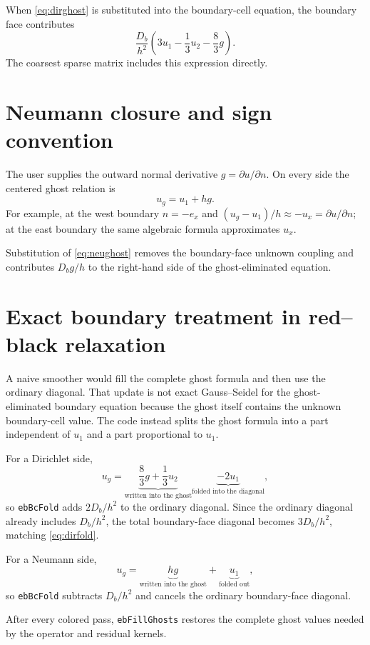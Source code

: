 \documentclass[11pt,oneside,openany]{book}
\newcommand{\code}[1]{\textnormal{\texttt{#1}}}
\begin{document}
When \cref{eq:dirghost} is substituted into the boundary-cell equation, the boundary face contributes
\begin{equation}
  \frac{D_b}{h^2}\left(3u_1-\frac13u_2-\frac83g\right).
  \label{eq:dirfold}
\end{equation}
The coarsest sparse matrix includes this expression directly.

\section{Neumann closure and sign convention}
The user supplies the outward normal derivative $g=\partial u/\partial n$. On every side the centered ghost relation is
\begin{equation}
  u_g=u_1+h g.
  \label{eq:neughost}
\end{equation}
For example, at the west boundary $n=-e_x$ and
$(u_g-u_1)/h\approx-u_x=\partial u/\partial n$; at the east boundary the same algebraic formula approximates $u_x$.

Substitution of \cref{eq:neughost} removes the boundary-face unknown coupling and contributes $D_bg/h$ to the right-hand side of the ghost-eliminated equation.

\section{Exact boundary treatment in red--black relaxation}
A naive smoother would fill the complete ghost formula and then use the ordinary diagonal. That update is not exact Gauss--Seidel for the ghost-eliminated boundary equation because the ghost itself contains the unknown boundary-cell value. The code instead splits the ghost formula into a part independent of $u_1$ and a part proportional to $u_1$.

For a Dirichlet side,
\[
 u_g=\underbrace{\frac83g+\frac13u_2}_{\text{written into the ghost}}
     \underbrace{-2u_1}_{\text{folded into the diagonal}},
\]
so \code{ebBcFold} adds $2D_b/h^2$ to the ordinary diagonal. Since the ordinary diagonal already includes $D_b/h^2$, the total boundary-face diagonal becomes $3D_b/h^2$, matching \cref{eq:dirfold}.

For a Neumann side,
\[
 u_g=\underbrace{hg}_{\text{written into the ghost}}+\underbrace{u_1}_{\text{folded out}},
\]
so \code{ebBcFold} subtracts $D_b/h^2$ and cancels the ordinary boundary-face diagonal.

After every colored pass, \code{ebFillGhosts} restores the complete ghost values needed by the operator and residual kernels.
\end{document}
